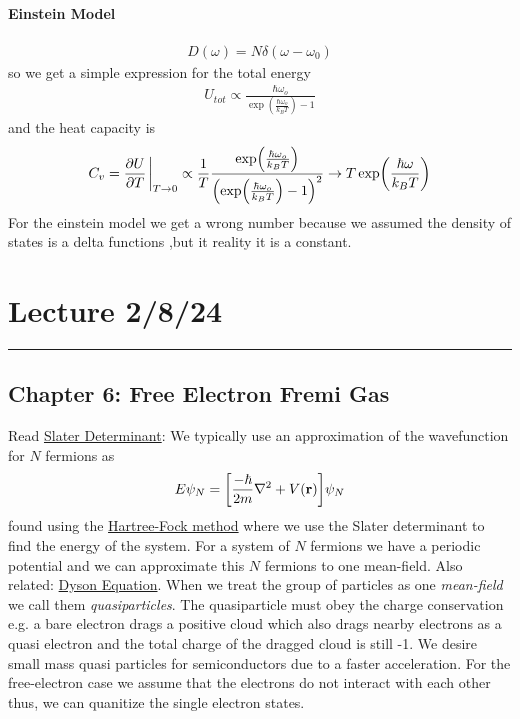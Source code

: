 \documentclass[../main.tex]{subfiles}
\begin{document}
\paragraph*{Einstein Model}
\begin{align*}
  D(\omega) = N \delta(\omega - \omega_0)
\end{align*}
so we get a simple expression for the total energy
\begin{align*}
    U_{tot} \propto \frac{\hbar \omega_o}{\exp(\frac{\hbar \omega_o}{k_B T}) - 1}
\end{align*}
and the heat capacity is
\begin{align*}
    C_v = \pdv{U}{T}\eval_{T \to 0}
    \propto \frac{1}{T} \frac{\exp(\frac{\hbar \omega_o}{k_B T})}{\qt(\exp(\frac{\hbar \omega_o}{k_B T}) - 1)^2} 
    \to T\exp(\frac{\hbar\omega}{k_B T})
\end{align*}
For the einstein model we get a wrong number because we assumed the density of states is a delta functions
,but it reality it is a constant.

\newpage
\section{Lecture 2/8/24}
\hrule \vspace{10px}

\subsection*{Chapter 6: Free Electron Fremi Gas} Read
\href{https://en.wikipedia.org/wiki/Slater_determinant}{Slater Determinant}:
We typically use an approximation of the wavefunction for $N$ fermions as
\begin{align*}
    E\psi_N = \qt[\frac{-\hbar}{2m} \laplacian + V(\vb{r})] \psi_N
\end{align*}
found using the \href{https://en.wikipedia.org/wiki/Hartree%E2%80%93Fock_method}{Hartree-Fock method}
where we use the Slater determinant to find the energy of the system. For a system of $N$ fermions
we have a periodic potential and we can approximate this $N$ fermions to one mean-field. Also 
related: \href{https://en.wikipedia.org/wiki/Schwinger%E2%80%93Dyson_equation}{Dyson Equation}. When
we treat the group of particles as one \emph{mean-field} we call them \emph{quasiparticles}. The 
quasiparticle must obey the charge conservation e.g. a bare electron drags a positive cloud which
also drags nearby electrons as a quasi electron and the total charge of the dragged cloud is still
-1. We desire small mass quasi particles for semiconductors due to a faster acceleration. For the
free-electron case we assume that the electrons do not interact with each other thus, we can 
quanitize the single electron states.
\end{document}
